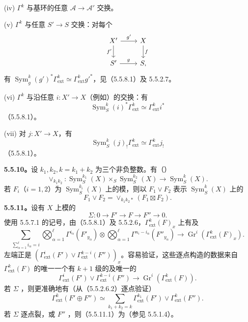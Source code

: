 (iv)  $\Gamma^k$ 与基环的任意 $\mathscr A\to\mathscr A'$ 交换。

(v)  $\Gamma^k$ 与任意 $S'\to S$ 交换：对每个
\[\begin{tikzcd}X'\arrow[r,"g'"]\arrow[d,"f'"']&X\arrow[d,"f"]\\S'\arrow[r,"g"]&S,\end{tikzcd}\]
有 $\operatorname{Sym}^k_g(g')^*\Gamma^k_{\mathrm{ext}}\simeq\Gamma^k_{\mathrm{ext}}g'^*$，见（5.5.8.1）及 5.5.2.7。

(vi)  $\Gamma^k$ 与沿任意 $i:X'\to X$（例如）的交换：有
\[\operatorname{Sym}^k_S(i)^*\Gamma^k_{\mathrm{ext}}\simeq\Gamma^k_{\mathrm{ext}}i^*\]
（5.5.8.1）。

(vii) 对 $j:X'\to X$，有
\[\operatorname{Sym}^k_S(j)_!\Gamma^k_{\mathrm{ext}}\simeq\Gamma^k_{\mathrm{ext}}j_!\]
（5.5.8.1）。

\textbf{5.5.10。}设 $k_1,k_2,k=k_1+k_2$ 为三个非负整数。有（）
\[\vee_{k_1k_2}:\operatorname{Sym}^{k_1}_S(X)\times_S\operatorname{Sym}^{k_2}_S(X)\longrightarrow\operatorname{Sym}^k_S(X).\]
若 $F_i$（$i=1,2$）为 $\operatorname{Sym}^{k_i}_S(X)$ 上的模，则以 $F_1\vee F_2$ 表示 $\operatorname{Sym}^k_S(X)$ 上的
\[F_1\vee F_2=\vee_{k_1k_2*}(F_1\boxtimes F_2).\]
\textbf{5.5.11。}设有 $X$ 上模的
\[\Sigma:0\longrightarrow F'\longrightarrow F\longrightarrow F''\longrightarrow0.\]
使用 5.5.7.1 的记号，由（5.5.8.1）及 5.5.2.6，$\Gamma^k_{\mathrm{ext}}(F)_x$ 上有及
\[\sum_{\sum_{\alpha=1}^{\ell}i_\alpha=i}\bigotimes_{\alpha=1}^{\ell}\Gamma^{i_\alpha}(F'_{y_\alpha})\otimes\bigotimes_{\alpha=1}^{\ell}\Gamma^{n_i-i_\alpha}(F''_{y_\alpha})\longrightarrow\operatorname{Gr}^i(\Gamma^k_{\mathrm{ext}}(F)_x).\]
左端正是 $(\Gamma^i_{\mathrm{ext}}(F')\vee\Gamma^{k-i}_{\mathrm{ext}}(F''))_x$。容易验证，这些逐点构造的数据来自 $\Gamma^k_{\mathrm{ext}}(F)$ 的唯一一个有 $k+1$ 级的及唯一的
\begin{equation}\tag{5.5.11.1}\Gamma^i_{\mathrm{ext}}(F')\vee\Gamma^{k-i}_{\mathrm{ext}}(F'')\longrightarrow\operatorname{Gr}^i(\Gamma^k_{\mathrm{ext}}(F)).\end{equation}
若 $\Sigma$ ，则更准确地有（从（5.5.2.6.2）逐点验证）
\begin{equation}\tag{5.5.11.2}\Gamma^k_{\mathrm{ext}}(F'\oplus F'')\simeq\sum_{k_1+k_2=k}\Gamma^{k_1}_{\mathrm{ext}}(F')\vee\Gamma^k_{\mathrm{ext}}(F'').\end{equation}
若 $\Sigma$ 逐点裂，或 $F''$ ，则（5.5.11.1）为（参见 5.5.1.4）。

